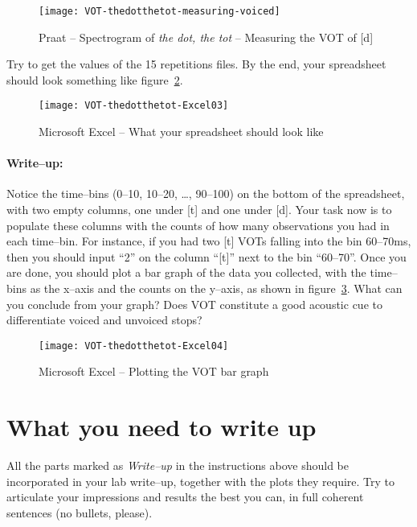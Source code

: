 \documentclass{article}
\newcommand{\soft}[1]{\textsf{#1}}
\newcommand{\MSExcel}{\soft{Microsoft\texttrademark{} Excel}}
\newcommand{\Praat}{\soft{Praat}}
\begin{document}
\begin{figure}[!tbp]
\caption{\Praat{} -- Spectrogram of \emph{the dot, the tot} -- Measuring the VOT of [d]}
\label{step5VOT}
	\begin{center}
		\texttt{[image: VOT-thedotthetot-measuring-voiced]}
	\end{center}
\end{figure}
 
Try to get the values of the 15 repetitions files. By the end, your spreadsheet should look something like figure~\ref{step6VOT}.

\begin{figure}[!tbp]
\caption{\MSExcel{} -- What your spreadsheet should look like}
\label{step6VOT}
	\begin{center}
		\texttt{[image: VOT-thedotthetot-Excel03]}
	\end{center}
\end{figure}

\paragraph{Write--up:} Notice the time--bins (0--10, 10--20, \dots{}, 90--100) on the bottom of the spreadsheet, with two empty columns, one under [t] and one under [d]. Your task now is to populate these columns with the counts of how many observations you had in each time--bin. For instance, if you had two [t] VOTs falling into the bin 60--70ms, then you should input ``2'' on the column ``[t]'' next to the bin ``60--70''. Once you are done, you should plot a bar graph of the data you collected, with the time--bins as the x--axis and the counts on the y--axis, as shown in figure~\ref{step7VOT}. What can you conclude from your graph? Does VOT constitute a good acoustic cue to differentiate voiced and unvoiced stops?

\begin{figure}[!tbp]
\caption{\MSExcel{} -- Plotting the VOT bar graph}
\label{step7VOT}
	\begin{center}
		\texttt{[image: VOT-thedotthetot-Excel04]}
	\end{center}
\end{figure}
 
\section{What you need to write up}

All the parts marked as \emph{Write--up} in the instructions above should be incorporated in your lab write--up, together with the plots they require. Try to articulate your impressions and results the best you can, in full coherent sentences (no bullets, please).
\end{document}
